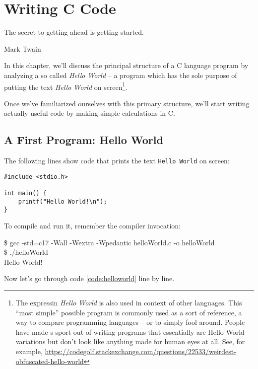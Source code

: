 \chapter{Writing C Code}
\epigraph{The secret to getting ahead is getting started.}{Mark Twain}

In this chapter, we'll discuss the principal structure of a C language program by analyzing a so called \emph{Hello World} -- a program which has the sole purpose of putting the text \emph{Hello World} on screen\footnote{The expressin \emph{Hello World} is also used in context of other languages. This \enquote{most simple} possible program is commonly used as a sort of reference, a way to compare programming languages -- or to simply fool around. People have made s sport out of writing programs that essentially are Hello World variations but don't look like anything made for human eyes at all. See, for example, \url{https://codegolf.stackexchange.com/questions/22533/weirdest-obfuscated-hello-world}}.

Once we've familiarized ourselves with this primary structure, we'll start writing actually useful code by making simple calculations in C.

\section{A First Program: Hello World}

The following lines show code that prints the text \texttt{Hello World} on screen:
\begin{codebox}[helloworld.c]
\begin{verbatim}
#include <stdio.h>

int main() {
    printf("Hello World!\n");
}
\end{verbatim}
 \label{code:helloworld}
\end{codebox}

To compile and run it, remember the compiler invocation:

\begin{cmdbox}
\$ gcc -std=c17 -Wall -Wextra -Wpedantic helloWorld.c -o helloWorld \\
\$ ./helloWorld \\
Hello World!
\end{cmdbox}

Now let's go through code \ref{code:helloworld} line by line.

